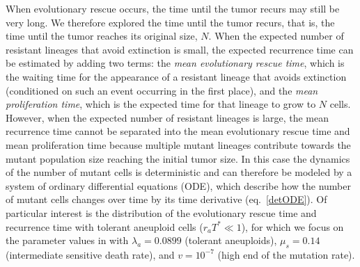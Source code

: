 \documentclass[12pt]{extarticle}
\renewcommand{\Delta}{r}
\begin{document}
When evolutionary rescue occurs, the time until the tumor recurs may still be very long. We therefore explored the time until the tumor recurs, that is, the time until the tumor reaches its original size, $N$.
When the expected number of resistant lineages that avoid extinction is small, the expected recurrence time can be estimated by adding two terms: the \emph{mean evolutionary rescue time}, which is the waiting time for the appearance of a resistant lineage that avoids extinction (conditioned on such an event occurring in the first place), and the \emph{mean proliferation time}, which is the expected time for that lineage to grow to $N$ cells.
However, when the expected number of resistant lineages is large, the mean recurrence time cannot be separated into the mean evolutionary rescue time and mean proliferation time because multiple mutant lineages contribute towards the mutant population size reaching the initial tumor size.
In this case the dynamics of the number of mutant cells is deterministic and can therefore be modeled by a system of ordinary differential equations (ODE), which describe how the number of mutant cells changes over time by its time derivative (eq.~\ref{detODE}). %
Of particular interest is the distribution of the evolutionary rescue time and recurrence time with tolerant aneuploid cells ($\Delta_a T^*\ll1$), for which we focus on the parameter values in  with $\lambda_a=0.0899$ (tolerant aneuploids), $\mu_s=0.14$ (intermediate sensitive death rate), and $v=10^{-7}$ (high end of the mutation rate).
\end{document}
